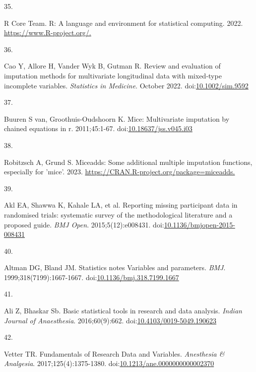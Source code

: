 \documentclass[
]{book}
\newlength{\cslhangindent}
\newlength{\csllabelwidth}
\newlength{\cslentryspacingunit} %
\newenvironment{CSLReferences}[2] %
 {%
  \setlength{\parindent}{0pt}
  \ifodd #1
  \let\oldpar\par
  \def\par{\hangindent=\cslhangindent\oldpar}
  \fi
  \setlength{\parskip}{#2\cslentryspacingunit}
 }%
 {}
\newcommand{\CSLLeftMargin}[1]{\parbox[t]{\csllabelwidth}{#1}}
\newcommand{\CSLRightInline}[1]{\parbox[t]{\linewidth - \csllabelwidth}{#1}\break}
\begin{document}
\begin{CSLReferences}{0}{0}
\leavevmode{}%
\CSLLeftMargin{35. }%
\CSLRightInline{R Core Team. R: A language and environment for statistical computing. 2022. \href{https://www.R-project.org/}{https://www.R-project.org/.}}

\leavevmode{}%
\CSLLeftMargin{36. }%
\CSLRightInline{Cao Y, Allore H, Vander Wyk B, Gutman R. Review and evaluation of imputation methods for multivariate longitudinal data with mixed{-}type incomplete variables. \emph{Statistics in Medicine}. October 2022. doi:\href{https://doi.org/10.1002/sim.9592}{10.1002/sim.9592}}

\leavevmode{}%
\CSLLeftMargin{37. }%
\CSLRightInline{Buuren S van, Groothuis-Oudshoorn K. {\textbraceleft}Mice{\textbraceright}: Multivariate imputation by chained equations in r. 2011;45:1-67. doi:\href{https://doi.org/10.18637/jss.v045.i03}{10.18637/jss.v045.i03}}

\leavevmode{}%
\CSLLeftMargin{38. }%
\CSLRightInline{Robitzsch A, Grund S. Miceadds: Some additional multiple imputation functions, especially for 'mice'. 2023. \href{https://CRAN.R-project.org/package=miceadds}{https://CRAN.R-project.org/package=miceadds.}}

\leavevmode{}%
\CSLLeftMargin{39. }%
\CSLRightInline{Akl EA, Shawwa K, Kahale LA, et al. Reporting missing participant data in randomised trials: systematic survey of the methodological literature and a proposed guide. \emph{BMJ Open}. 2015;5(12):e008431. doi:\href{https://doi.org/10.1136/bmjopen-2015-008431}{10.1136/bmjopen-2015-008431}}

\leavevmode{}%
\CSLLeftMargin{40. }%
\CSLRightInline{Altman DG, Bland JM. Statistics notes Variables and parameters. \emph{BMJ}. 1999;318(7199):1667-1667. doi:\href{https://doi.org/10.1136/bmj.318.7199.1667}{10.1136/bmj.318.7199.1667}}

\leavevmode{}%
\CSLLeftMargin{41. }%
\CSLRightInline{Ali Z, Bhaskar Sb. Basic statistical tools in research and data analysis. \emph{Indian Journal of Anaesthesia}. 2016;60(9):662. doi:\href{https://doi.org/10.4103/0019-5049.190623}{10.4103/0019-5049.190623}}

\leavevmode{}%
\CSLLeftMargin{42. }%
\CSLRightInline{Vetter TR. Fundamentals of Research Data and Variables. \emph{Anesthesia \& Analgesia}. 2017;125(4):1375-1380. doi:\href{https://doi.org/10.1213/ane.0000000000002370}{10.1213/ane.0000000000002370}}


\end{CSLReferences}
\end{document}
